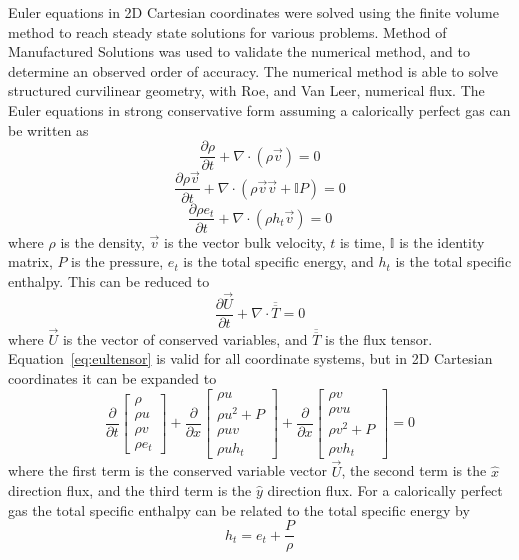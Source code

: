 \documentclass[]{aiaa-tc}%
\newcommand{\pderiv}[2]{\frac{\partial #1}{\partial #2}}
\newcommand*{\rttensor}[1]{\overline{\overline{#1}}}
\begin{document}
Euler equations in 2D Cartesian coordinates were solved using the finite volume method to reach steady state solutions for various problems. Method of Manufactured Solutions was used to validate the numerical method, and to determine an observed order of accuracy. The numerical method is able to solve structured curvilinear geometry, with Roe, and Van Leer, numerical flux. The Euler equations in strong conservative form assuming a calorically perfect gas can be written as
\begin{equation}\label{eq:eulrho}
  \pderiv{\rho}{t} + \nabla\cdot(\rho \vec{v}) = 0
\end{equation}
\begin{equation}\label{eq:eulmtm}
  \pderiv{\rho \vec{v}}{t} + \nabla\cdot(\rho \vec{v}\vec{v} + \mathbb{I} P) = 0
\end{equation}
\begin{equation}\label{eq:eulenergy}
  \pderiv{\rho e_t}{t} + \nabla\cdot(\rho h_t \vec{v}) = 0
\end{equation}
where $\rho$ is the density, $\vec{v}$ is the vector bulk velocity, $t$ is time, $\mathbb{I}$ is the identity matrix, $P$ is the pressure, $e_t$ is the total specific energy, and $h_t$ is the total specific enthalpy. This can be reduced to 
\begin{equation}\label{eq:eultensor}
  \pderiv{\vec{U}}{t} + \nabla\cdot\rttensor{T} = 0
\end{equation}
where $\vec{U}$ is the vector of conserved variables, and $\rttensor{T}$ is the flux tensor. Equation~\ref{eq:eultensor} is valid for all coordinate systems, but in 2D Cartesian coordinates it can be expanded to
\[
  \pderiv{}{t}
  \begin{bmatrix}
    \rho \\
    \rho u \\
    \rho v \\
    \rho e_t
  \end{bmatrix}
  + \pderiv{}{x}
  \begin{bmatrix}
    \rho u \\
    \rho u^2 + P \\
    \rho u v \\
    \rho u h_t
  \end{bmatrix}
   + \pderiv{}{x}
  \begin{bmatrix}
    \rho v \\
    \rho v u \\
    \rho v^2 + P \\
    \rho v h_t
  \end{bmatrix}
  =0
\]
where the first term is the conserved variable vector $\vec{U}$, the second term is the $\hat{x}$ direction flux, and the third term is the $\hat{y}$ direction flux. For a calorically perfect gas the total specific enthalpy can be related to the total specific energy by
\begin{equation} \label{eq:idealgas}
  h_t = e_t + \frac{P}{\rho}
\end{equation}
\end{document}

